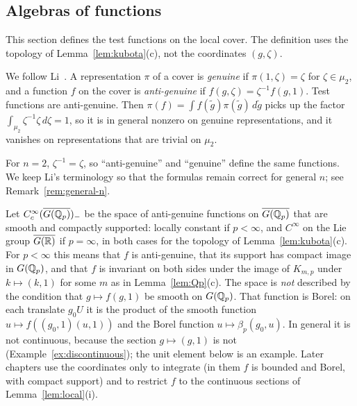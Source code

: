 \subsection{Algebras of functions}\label{sec:functions}

This section defines the test functions on the local cover. The
definition uses the topology of Lemma~\ref{lem:kubota}(c), not the
coordinates $(g,\zeta)$.


We follow Li~\cite{Li14a,Li14b}. A representation $\pi$ of a cover is
\emph{genuine} if $\pi(1,\zeta)=\zeta$ for $\zeta\in\mu_2$, and a
function $f$ on the cover is \emph{anti-genuine} if
$f(g,\zeta)=\zeta^{-1}f(g,1)$. Test functions are anti-genuine. Then
$\pi(f)=\int f(\tilde g)\pi(\tilde g)\,d\tilde g$ picks up the factor
$\int_{\mu_2}\zeta^{-1}\zeta\,d\zeta=1$, so it is in general nonzero on
genuine representations, and it vanishes on representations that are
trivial on $\mu_2$.

For $n=2$, $\zeta^{-1}=\zeta$, so ``anti-genuine'' and ``genuine''
define the same functions. We keep Li's terminology so that the formulas remain correct
for general $n$; see Remark~\ref{rem:general-n}.

Let $C_c^\infty(\overline{G(\mathbb{Q}_p)})_-$ be the space of anti-genuine
functions on $\overline{G(\mathbb{Q}_p)}$ that are smooth and compactly
supported: locally constant if $p<\infty$, and $C^\infty$ on the Lie
group $\overline{G(\mathbb{R})}$ if $p=\infty$, in both cases for the topology of
Lemma~\ref{lem:kubota}(c). For $p<\infty$ this means that $f$ is
anti-genuine, that its support has compact image in $G(\mathbb{Q}_p)$, and that
$f$ is invariant on both sides under the image of $K_{m,p}$ under
$k\mapsto(k,1)$ for some $m$ as in Lemma~\ref{lem:Qp}(c). The space is
\emph{not} described by the condition that $g\mapsto f(g,1)$ be smooth
on $G(\mathbb{Q}_p)$. That function is Borel: on each translate $g_0U$ it is the
product of the smooth function $u\mapsto f((g_0,1)(u,1))$ and the Borel
function $u\mapsto\beta_p(g_0,u)$. In general it is not continuous,
because the section $g\mapsto(g,1)$ is not
(Example~\ref{ex:discontinuous}); the unit element below is an example.
Later chapters use the coordinates only to integrate (in them $f$ is
bounded and Borel, with compact support) and to restrict $f$ to the
continuous sections of Lemma~\ref{lem:local}(i).

